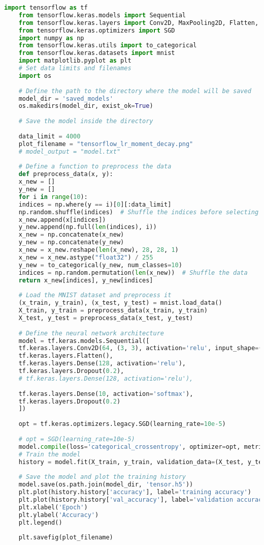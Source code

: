 \begin{lstlisting}[language=Python, caption=CNN]
	import tensorflow as tf
	from tensorflow.keras.models import Sequential
	from tensorflow.keras.layers import Conv2D, MaxPooling2D, Flatten, Dense, Dropout
	from tensorflow.keras.optimizers import SGD
	import numpy as np
	from tensorflow.keras.utils import to_categorical
	from tensorflow.keras.datasets import mnist
	import matplotlib.pyplot as plt
	# Set data limits and filenames
	import os
	
	# Define the path to the directory where the model will be saved
	model_dir = 'saved_models'
	os.makedirs(model_dir, exist_ok=True)
	
	# Save the model inside the directory
	
	data_limit = 4000
	plot_filename = "tensorflow_lr_moment_decay.png"
	# model_output = "model.txt"
	
	# Define a function to preprocess the data
	def preprocess_data(x, y):
	x_new = []
	y_new = []
	for i in range(10):
	indices = np.where(y == i)[0][:data_limit]
	np.random.shuffle(indices)  # Shuffle the indices before selecting data
	x_new.append(x[indices])
	y_new.append(np.full(len(indices), i))
	x_new = np.concatenate(x_new)
	y_new = np.concatenate(y_new)
	x_new = x_new.reshape(len(x_new), 28, 28, 1)
	x_new = x_new.astype("float32") / 255
	y_new = to_categorical(y_new, num_classes=10)
	indices = np.random.permutation(len(x_new))  # Shuffle the data
	return x_new[indices], y_new[indices]
	
	# Load the MNIST dataset and preprocess it
	(x_train, y_train), (x_test, y_test) = mnist.load_data()
	X_train, y_train = preprocess_data(x_train, y_train)
	X_test, y_test = preprocess_data(x_test, y_test)
	
	# Define the neural network architecture
	model = tf.keras.models.Sequential([
	tf.keras.layers.Conv2D(64, (3, 3), activation='relu', input_shape=(28, 28, 1)),
	tf.keras.layers.Flatten(),
	tf.keras.layers.Dense(128, activation='relu'),
	tf.keras.layers.Dropout(0.2),
	# tf.keras.layers.Dense(128, activation='relu'),
	
	tf.keras.layers.Dense(10, activation='softmax'),
	tf.keras.layers.Dropout(0.2)
	])
	
	opt = tf.keras.optimizers.legacy.SGD(learning_rate=10e-5)
	
	# opt = SGD(learning_rate=10e-5)
	model.compile(loss='categorical_crossentropy', optimizer=opt, metrics=['accuracy'])
	# Train the model
	history = model.fit(X_train, y_train, validation_data=(X_test, y_test), epochs=100,batch_size=64)
	
	# Save the model and plot the training history
	model.save(os.path.join(model_dir, 'tensor.h5'))
	plt.plot(history.history['accuracy'], label='training accuracy')
	plt.plot(history.history['val_accuracy'], label='validation accuracy')
	plt.xlabel('Epoch')
	plt.ylabel('Accuracy')
	plt.legend()
	
	plt.savefig(plot_filename)
\end{lstlisting}